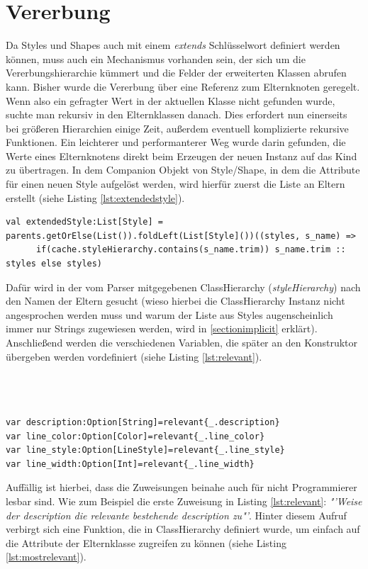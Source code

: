 \section{Vererbung}\label{sectionInheritance}
Da Styles und Shapes auch mit einem \textit{extends} Schlüsselwort definiert werden können, muss auch ein Mechanismus vorhanden sein, der sich um die Vererbungshierarchie kümmert und die Felder der erweiterten Klassen abrufen kann.
Bisher wurde die Vererbung über eine Referenz zum Elternknoten geregelt. Wenn also ein gefragter Wert in der aktuellen Klasse nicht gefunden wurde, suchte man rekursiv in den Elternklassen danach.
Dies erfordert nun einerseits bei größeren Hierarchien einige Zeit, außerdem eventuell komplizierte rekursive Funktionen.
Ein leichterer und performanterer Weg wurde darin gefunden, die Werte eines Elternknotens direkt beim Erzeugen der neuen Instanz auf das Kind zu übertragen.
In dem Companion Objekt von Style/Shape, in dem die Attribute für einen neuen Style aufgelöst werden, wird hierfür zuerst die Liste an Eltern erstellt (siehe Listing \ref{lst:extendedstyle}).
\begin{lstlisting}[style=scala, caption = {sammeln der Elterninstanzen}, label = {lst:extendedstyle}]
val extendedStyle:List[Style] = parents.getOrElse(List()).foldLeft(List[Style]())((styles, s_name) =>
      if(cache.styleHierarchy.contains(s_name.trim)) s_name.trim :: styles else styles)
\end{lstlisting}Dafür wird in der vom Parser mitgegebenen ClassHierarchy (\textit{styleHierarchy}) nach den Namen der Eltern gesucht (wieso hierbei die ClassHierarchy Instanz nicht angesprochen werden muss und warum der Liste aus Styles augenscheinlich immer nur Strings zugewiesen werden, wird in \ref{sectionimplicit} erklärt).
Anschließend werden die verschiedenen Variablen, die später an den Konstruktor übergeben werden vordefiniert (siehe Listing \ref{lst:relevant}).\\\\\\\\
\begin{lstlisting}[style=scala, caption = {Zuweisung der Felder der Elternelemente}, label = {lst:relevant}]
var description:Option[String]=relevant{_.description}
var line_color:Option[Color]=relevant{_.line_color}
var line_style:Option[LineStyle]=relevant{_.line_style}
var line_width:Option[Int]=relevant{_.line_width}
\end{lstlisting}Auffällig ist hierbei, dass die Zuweisungen beinahe auch für nicht Programmierer lesbar sind. Wie zum Beispiel die erste Zuweisung in Listing \ref{lst:relevant}: \textit{"'Weise der description die relevante bestehende description zu"'}. Hinter diesem Aufruf verbirgt sich eine Funktion, die in ClassHierarchy definiert wurde, um einfach auf die Attribute der Elternklasse zugreifen zu können (siehe Listing \ref{lst:mostrelevant}).
